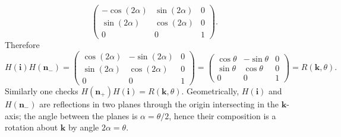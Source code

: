 \begin{solution}
\[\begin{pmatrix}
		-\cos(2\alpha) & \sin(2\alpha) & 0\\
		\sin(2\alpha) & \cos(2\alpha) & 0\\
		0&0&1
	\end{pmatrix}.
	\]
	Therefore
	\[
	H(\mathbf i)H(\mathbf n_-)=
	\begin{pmatrix}
		\cos(2\alpha) & -\sin(2\alpha) & 0\\
		\sin(2\alpha) & \cos(2\alpha) & 0\\
		0&0&1
	\end{pmatrix}
	=
	\begin{pmatrix}
		\cos\theta & -\sin\theta & 0\\
		\sin\theta & \cos\theta & 0\\
		0&0&1
	\end{pmatrix}
	=R(\mathbf k,\theta).
	\]
	Similarly one checks $H(\mathbf n_+)H(\mathbf i)=R(\mathbf k,\theta)$.
	Geometrically, $H(\mathbf i)$ and $H(\mathbf n_-)$ are reflections in two planes through the origin intersecting in the $\mathbf k$-axis; the angle between the planes is $\alpha=\theta/2$, hence their composition is a rotation about $\mathbf k$ by angle $2\alpha=\theta$.


\end{solution}
